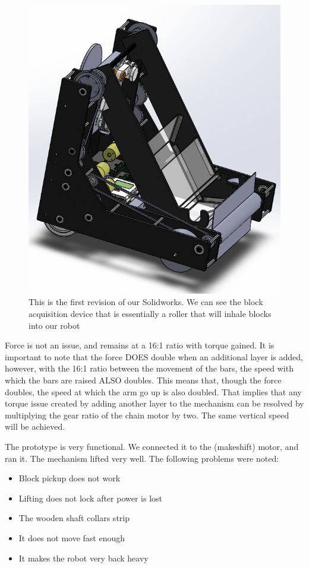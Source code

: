\begin{figure}[H]
\begin{center}
\includegraphics[scale=0.5]{images/RobotV1.png}
\end{center}
\caption{This is the first revision of our Solidworks. We can see the block acquisition device that is essentially a roller that will inhale blocks into our robot}
\end{figure}

Force is not an issue, and remains at a 16:1 ratio with torque gained. It is important to note that the force DOES double when an additional layer is added, however, with the 16:1 ratio between the movement of the bars, the speed with which the bars are raised ALSO doubles. This means that, though the force doubles, the speed at which the arm go up is also doubled. That implies that any torque issue created by adding another layer to the mechanism can be resolved by multiplying the gear ratio of the chain motor by two. The same vertical speed will be achieved.

The prototype is very functional. We connected it to the (makeshift) motor, and ran it. The mechanism lifted very well. The following problems were noted:
\begin{itemize}
\item Block pickup does not work
\item Lifting does not lock after power is lost
\item The wooden shaft collars strip
\item It does not move fast enough
\item It makes the robot very back heavy
\end{itemize}

